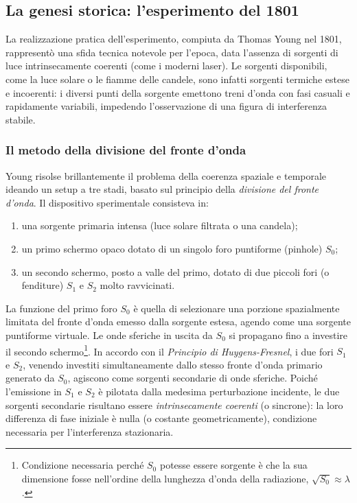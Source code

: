 \documentclass[a4paper,11pt]{report}
\begin{document}
\subsection{La genesi storica: l'esperimento del 1801}
La realizzazione pratica dell'esperimento, compiuta da Thomas Young nel 1801, rappresentò una sfida tecnica notevole per l'epoca, data l'assenza di sorgenti di luce intrinsecamente coerenti (come i moderni laser).
Le sorgenti disponibili, come la luce solare o le fiamme delle candele, sono infatti sorgenti termiche estese e incoerenti: i diversi punti della sorgente emettono treni d'onda con fasi casuali e rapidamente variabili, impedendo l'osservazione di una figura di interferenza stabile.

\subsubsection{Il metodo della divisione del fronte d'onda}
Young risolse brillantemente il problema della coerenza spaziale e temporale ideando un setup a tre stadi, basato sul principio della \textit{divisione del fronte d'onda}.
Il dispositivo sperimentale consisteva in:
\begin{enumerate}
    \item una sorgente primaria intensa (luce solare filtrata o una candela);
    \item un primo schermo opaco dotato di un singolo foro puntiforme (pinhole) $S_0$;
    \item un secondo schermo, posto a valle del primo, dotato di due piccoli fori (o fenditure) $S_1$ e $S_2$ molto ravvicinati.
\end{enumerate}
La funzione del primo foro $S_0$ è quella di selezionare una porzione spazialmente limitata del fronte d'onda emesso dalla sorgente estesa, agendo come una sorgente puntiforme virtuale. Le onde sferiche in uscita da $S_0$ si propagano fino a investire il secondo schermo\footnote{Condizione necessaria perché $S_0$ potesse essere sorgente è che la sua dimensione fosse nell'ordine della lunghezza d'onda della radiazione, $\sqrt{S_0} \approx \lambda$.}.
In accordo con il \textit{Principio di Huygens-Fresnel}, i due fori $S_1$ e $S_2$, venendo investiti simultaneamente dallo stesso fronte d'onda primario generato da $S_0$, agiscono come sorgenti secondarie di onde sferiche.
Poiché l'emissione in $S_1$ e $S_2$ è pilotata dalla medesima perturbazione incidente, le due sorgenti secondarie risultano essere \textit{intrinsecamente coerenti} (o sincrone): la loro differenza di fase iniziale è nulla (o costante geometricamente), condizione necessaria per l'interferenza stazionaria.
\end{document}
